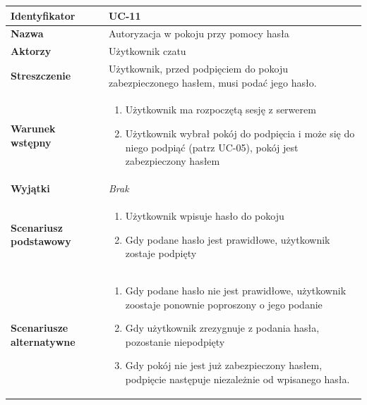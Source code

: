 \documentclass[11pt,oneside,a4paper,titlepage,onecolumn]{article}
\newenvironment{enumreq}
{ \begin{enumerate}[topsep=0pt,itemsep=-1ex,partopsep=1ex,parsep=1ex] }
{ \end{enumerate}                  }
\begin{document}
{\begin{tabular}{ | l | l | }
	\hline
\end{tabular}

\vspace{2em}

\begin{tabular}{ | l | l | }
	\hline
		\textbf{Identyfikator} & 
		UC-11
		\\
		
	\hline
		\textbf{Nazwa} & 
		Autoryzacja w pokoju przy pomocy hasła
		\\
		
	\hline
		\textbf{Aktorzy} & \parbox[t]{11cm}{
			Użytkownik czatu
		}\\
		 
	\hline
		\parbox[t]{4cm}{\textbf{Streszczenie}} & \parbox[t]{11cm}{
			Użytkownik, przed podpięciem do pokoju zabezpieczonego hasłem,
			musi podać jego hasło.
			
		}\\
		
	\hline
		\parbox[t]{4cm}{\textbf{Warunek wstępny}} & \parbox[t]{11cm}{
			\begin{enumreq}
				\item Użytkownik ma rozpoczętą sesję z serwerem
				\item Użytkownik wybrał pokój do podpięcia i może się do
				niego podpiąć (patrz UC-05), pokój jest zabezpieczony 
				hasłem
			\end{enumreq}
				
		}
		\\
		
	\hline
		\parbox[t]{4cm}{\textbf{Wyjątki}} & \parbox[t]{11cm}{
			\textit{Brak}
			
		}
		\\

	\hline
		\parbox[t]{4cm}{\textbf{Scenariusz podstawowy}} & \parbox[t]{11cm}{
			\begin{enumreq}
				\item Użytkownik wpisuje hasło do pokoju
				\item Gdy podane hasło jest prawidłowe, użytkownik
				zostaje podpięty
			\end{enumreq}
		}
		\\
		
	\hline
		\parbox[t]{4cm}{\textbf{Scenariusze alternatywne}} & \parbox[t]
		{11cm}{
			\begin{enumreq}
				\item Gdy podane hasło nie jest prawidłowe, użytkownik
				zoostaje ponownie poproszony o jego podanie
				\item Gdy użytkownik zrezygnuje z podania hasła, pozostanie
				niepodpięty
				\item Gdy pokój nie jest już zabezpieczony hasłem, podpięcie
				następuje niezależnie od wpisanego hasła.
			\end{enumreq}
		}
		\\
		

\end{tabular}}
\end{document}
